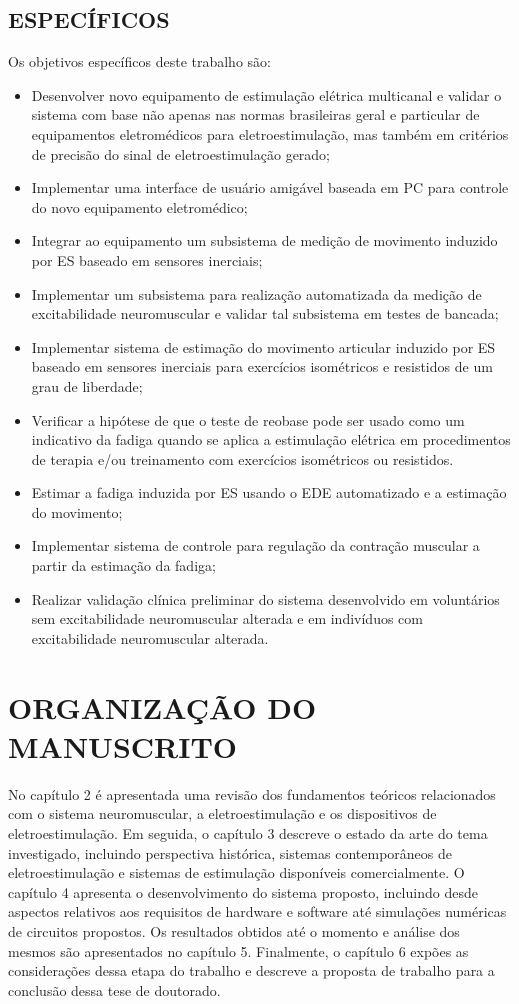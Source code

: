 \subsection{ESPECÍFICOS}
Os objetivos específicos deste trabalho são:
\begin{itemize}
\item Desenvolver novo equipamento de estimulação elétrica multicanal e validar o sistema com base não apenas nas normas brasileiras geral e particular de equipamentos eletromédicos para eletroestimulação, mas também em critérios de precisão do sinal de eletroestimulação gerado;
\item Implementar uma interface de usuário amigável baseada em PC para controle do novo equipamento eletromédico; 
\item Integrar ao equipamento um subsistema de medição de movimento induzido por ES baseado em sensores inerciais;
\item Implementar um subsistema para realização automatizada da medição de excitabilidade neuromuscular e validar tal subsistema em testes de bancada;
\item Implementar sistema de estimação do movimento articular induzido por ES baseado em sensores inerciais para exercícios isométricos e resistidos de um grau de liberdade;
\item Verificar a hipótese de que o teste de reobase pode ser usado como um indicativo da fadiga quando se aplica a estimulação elétrica em procedimentos de terapia e/ou treinamento com exercícios isométricos ou resistidos.
\item Estimar a fadiga induzida por \acrshort{ES} usando o \acrshort{EDE} automatizado e a estimação do movimento;
\item Implementar sistema de controle para regulação da contração muscular a partir da estimação da fadiga;
\item Realizar validação clínica preliminar do sistema desenvolvido em voluntários sem excitabilidade neuromuscular alterada e em indivíduos com excitabilidade neuromuscular alterada.
\end{itemize}

\section{ORGANIZAÇÃO DO MANUSCRITO}
No capítulo 2 é apresentada uma revisão dos fundamentos teóricos relacionados com o sistema neuromuscular, a eletroestimulação e os dispositivos de eletroestimulação. Em seguida, o capítulo 3 descreve o estado da arte do tema investigado, incluindo perspectiva histórica, sistemas contemporâneos de eletroestimulação e sistemas de estimulação disponíveis comercialmente. O capítulo 4 apresenta o desenvolvimento do sistema proposto, incluindo desde aspectos relativos aos requisitos de hardware e software até simulações numéricas de circuitos propostos. Os resultados obtidos até o momento e análise dos mesmos são apresentados no capítulo 5. Finalmente, o capítulo 6 expões as considerações dessa etapa do trabalho e descreve a proposta de trabalho para a conclusão dessa tese de doutorado.